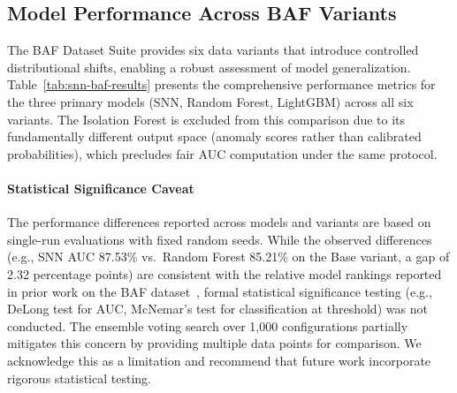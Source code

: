 \subsection{Model Performance Across BAF Variants}

The BAF Dataset Suite provides six data variants that introduce controlled distributional shifts, enabling a robust assessment of model generalization. Table~\ref{tab:snn-baf-results} presents the comprehensive performance metrics for the three primary models (SNN, Random Forest, LightGBM) across all six variants. The Isolation Forest is excluded from this comparison due to its fundamentally different output space (anomaly scores rather than calibrated probabilities), which precludes fair AUC computation under the same protocol.

\paragraph{Statistical Significance Caveat} The performance differences reported across models and variants are based on single-run evaluations with fixed random seeds. While the observed differences (e.g., SNN AUC 87.53\% vs.\ Random Forest 85.21\% on the Base variant, a gap of 2.32 percentage points) are consistent with the relative model rankings reported in prior work on the BAF dataset~\cite{jesus2022bank,uwaoma2022revisiting}, formal statistical significance testing (e.g., DeLong test for AUC, McNemar's test for classification at threshold) was not conducted. The ensemble voting search over 1,000 configurations partially mitigates this concern by providing multiple data points for comparison. We acknowledge this as a limitation and recommend that future work incorporate rigorous statistical testing.

